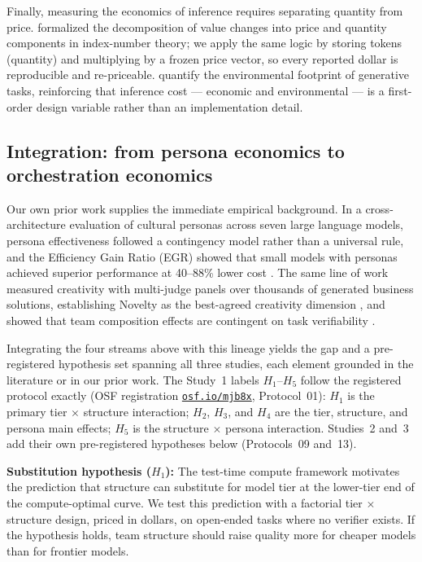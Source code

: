 \documentclass[12pt,a4paper]{article}
\begin{document}
Finally, measuring the economics of inference requires separating quantity from
price. \citet{Diewert1976} formalized the decomposition of value changes into
price and quantity components in index-number theory; we apply the same logic
by storing tokens (quantity) and multiplying by a frozen price vector, so every
reported dollar is reproducible and re-priceable. \citet{TomlinsonEtAl2024}
quantify the environmental footprint of generative tasks, reinforcing that
inference cost --- economic and environmental --- is a first-order design
variable rather than an implementation detail.

\subsection{Integration: from persona economics to orchestration economics}

Our own prior work supplies the immediate empirical background. In a
cross-architecture evaluation of cultural personas across seven large language
models, persona effectiveness followed a contingency model rather than a
universal rule, and the Efficiency Gain Ratio (EGR) showed that small models
with personas achieved superior performance at 40--88\% lower cost
\citep{Hariri2026b}. The same line of work measured creativity with multi-judge
panels over thousands of generated business solutions, establishing Novelty as
the best-agreed creativity dimension \citep{Hariri2025a}, and showed that team
composition effects are contingent on task verifiability \citep{Hariri2025b}.

Integrating the four streams above with this lineage yields the gap and a
pre-registered hypothesis set spanning all three studies, each element grounded
in the literature or in our prior work. The Study~1 labels $H_1$--$H_5$ follow
the registered protocol exactly (OSF registration
\href{https://osf.io/mjb8x}{\texttt{osf.io/mjb8x}}, Protocol~01): $H_1$ is the
primary tier $\times$ structure interaction; $H_2$, $H_3$, and $H_4$ are the
tier, structure, and persona main effects; $H_5$ is the structure $\times$
persona interaction. Studies~2 and~3 add their own pre-registered hypotheses
below (Protocols~09 and~13).

\medskip
\noindent\textbf{Substitution hypothesis ($H_1$):} The test-time compute
framework \citep{SnellEtAl2024} motivates the prediction that structure can
substitute for model tier at the lower-tier end of the compute-optimal curve. We
test this prediction with a factorial tier $\times$ structure design, priced in
dollars, on open-ended tasks where no verifier exists. If the hypothesis holds,
team structure should raise quality more for cheaper models than for frontier
models.
\end{document}
